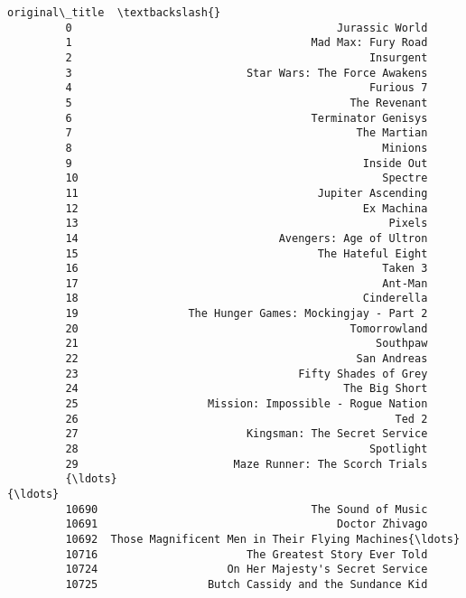 \documentclass[11pt]{article}
\begin{document}
\begin{Verbatim}[commandchars=\\\{\}]
                                                   original\_title  \textbackslash{}
         0                                         Jurassic World   
         1                                     Mad Max: Fury Road   
         2                                              Insurgent   
         3                           Star Wars: The Force Awakens   
         4                                              Furious 7   
         5                                           The Revenant   
         6                                     Terminator Genisys   
         7                                            The Martian   
         8                                                Minions   
         9                                             Inside Out   
         10                                               Spectre   
         11                                     Jupiter Ascending   
         12                                            Ex Machina   
         13                                                Pixels   
         14                               Avengers: Age of Ultron   
         15                                     The Hateful Eight   
         16                                               Taken 3   
         17                                               Ant-Man   
         18                                            Cinderella   
         19                 The Hunger Games: Mockingjay - Part 2   
         20                                          Tomorrowland   
         21                                              Southpaw   
         22                                           San Andreas   
         23                                  Fifty Shades of Grey   
         24                                         The Big Short   
         25                    Mission: Impossible - Rogue Nation   
         26                                                 Ted 2   
         27                          Kingsman: The Secret Service   
         28                                             Spotlight   
         29                        Maze Runner: The Scorch Trials   
         {\ldots}                                                  {\ldots}   
         10690                                 The Sound of Music   
         10691                                     Doctor Zhivago   
         10692  Those Magnificent Men in Their Flying Machines{\ldots}   
         10716                       The Greatest Story Ever Told   
         10724                    On Her Majesty's Secret Service   
         10725                 Butch Cassidy and the Sundance Kid   

\end{Verbatim}
\end{document}
